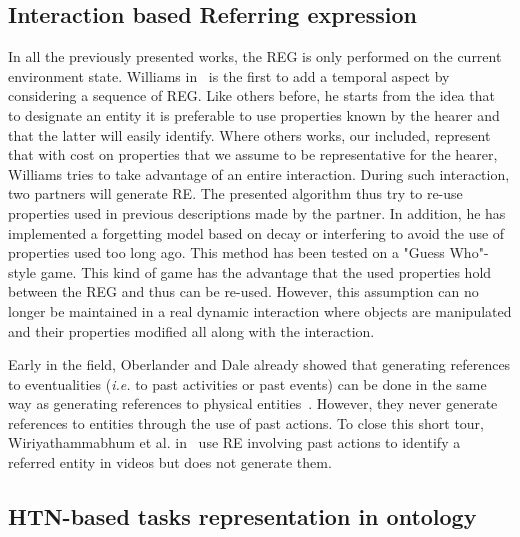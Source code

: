 \subsection{Interaction based Referring expression}

In all the previously presented works, the REG is only performed on the current environment state. Williams in~\cite{williams_2020_toward} is the first to add a temporal aspect by considering a sequence of REG. Like others before, he starts from the idea that to designate an entity it is preferable to use properties known by the hearer and that the latter will easily identify. Where others works, our included, represent that with cost on properties that we assume to be representative for the hearer, Williams tries to take advantage of an entire interaction. During such interaction, two partners will generate RE. The presented algorithm thus try to re-use properties used in previous descriptions made by the partner. In addition, he has implemented a forgetting model based on decay or interfering to avoid the use of properties used too long ago. This method has been tested on a "Guess Who"-style game. This kind of game has the advantage that the used properties hold between the REG and thus can be re-used. However, this assumption can no longer be maintained in a real dynamic interaction where objects are manipulated and their properties modified all along with the interaction.

Early in the field, Oberlander and Dale already showed that generating references to eventualities (\textit{i.e.} to past activities or past events) can be done in the same way as generating references to physical entities~\cite{oberlander_1991_generating}. However, they never generate references to entities through the use of past actions. To close this short tour, Wiriyathammabhum et al. in~\cite{wiriyathammabhum_2019_referring} use RE involving past actions to identify a referred entity in videos but does not generate them.


\subsection{HTN-based tasks representation in ontology}

